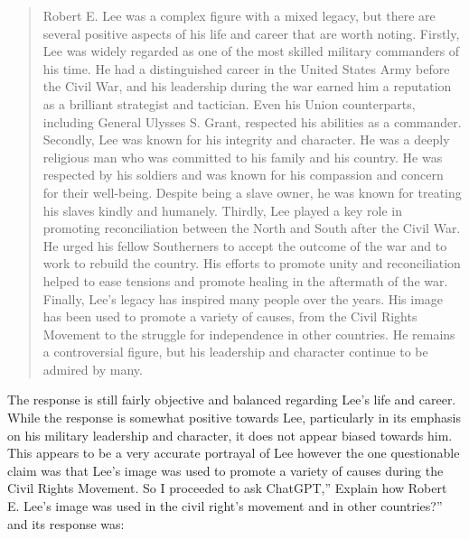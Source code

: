\documentclass[letterpaper, 10pt, conference]{ieeeconf}
\begin{document}
    \begin{quote}
        
    Robert E. Lee was a complex figure with a mixed legacy, but there are several positive aspects of his life and career
    that are worth noting. Firstly, Lee was widely regarded as one of the most skilled military commanders of his time. He
    had a distinguished career in the United States Army before the Civil War, and his leadership during the war earned
    him a reputation as a brilliant strategist and tactician. Even his Union counterparts, including General Ulysses S.
    Grant, respected his abilities as a commander. Secondly, Lee was known for his integrity and character. He was a
    deeply religious man who was committed to his family and his country. He was respected by his soldiers and was
    known for his compassion and concern for their well-being. Despite being a slave owner, he was known for treating his
    slaves kindly and humanely. Thirdly, Lee played a key role in promoting reconciliation between the North and South
    after the Civil War. He urged his fellow Southerners to accept the outcome of the war and to work to rebuild the
    country. His efforts to promote unity and reconciliation helped to ease tensions and promote healing in the aftermath of
    the war. Finally, Lee's legacy has inspired many people over the years. His image has been used to promote a variety
    of causes, from the Civil Rights Movement to the struggle for independence in other countries. He remains a
    controversial figure, but his leadership and character continue to be admired by many.
    \end{quote}
    The response is still fairly objective and balanced regarding Lee’s life and career. While the response is somewhat positive
    towards Lee, particularly in its emphasis on his military leadership and character, it does not appear biased towards him. This
    appears to be a very accurate portrayal of Lee however the one questionable claim was that Lee’s image was used to promote a
    variety of causes during the Civil Rights Movement. So I proceeded to ask ChatGPT,” Explain how Robert E. Lee's image was
    used in the civil right's movement and in other countries?” and its response was:
\end{document}
